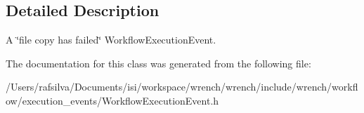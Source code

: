 \subsection{Detailed Description}
A \char`\"{}file copy has failed\char`\"{} Workflow\+Execution\+Event. 

The documentation for this class was generated from the following file\+:\begin{DoxyCompactItemize}
\item 
/\+Users/rafsilva/\+Documents/isi/workspace/wrench/wrench/include/wrench/workflow/execution\+\_\+events/Workflow\+Execution\+Event.\+h\end{DoxyCompactItemize}
